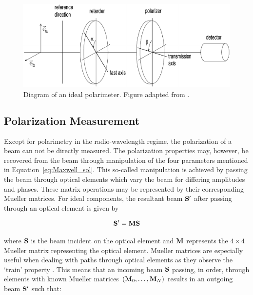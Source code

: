
\begin{figure}[t]
    \centering
    \includegraphics[width=1\textwidth]{figures/2_polarimeter.pdf}
    \caption{Diagram of an ideal polarimeter. Figure adapted from \cite{pol_in_spectra}.}
    \label{fig:polarimeter}
\end{figure}


\subsection{Polarization Measurement}\label{subsec:pol_measure}

Except for polarimetry in the radio-wavelength regime, the polarization of a beam can not be directly measured. The polarization properties may, however, be recovered from the beam through manipulation of the four parameters mentioned in Equation~\ref{eq:Maxwell_sol}. This so-called manipulation is achieved by passing the beam through optical elements which vary the beam for differing amplitudes and phases. These matrix operations may be represented by their corresponding Mueller matrices. For ideal components, the resultant beam $\mathbf{S}^{\prime}$ after passing through an optical element is given by

\begin{equation}
    \mathbf{S}^{\prime} = \mathbf{M} \mathbf{S}
\end{equation}

\noindent where $\mathbf{S}$ is the beam incident on the optical element and $\mathbf{M}$ represents the $4 \times 4$ Mueller matrix representing the optical element. Mueller matrices are especially useful when dealing with paths through optical elements as they observe the `train' property \citep{Mueller_train}. This means that an incoming beam $\mathbf{S}$ passing, in order, through elements with known Mueller matrices $(\mathbf{M}_{0}, \dots, \mathbf{M}_{N})$ results in an outgoing beam $\mathbf{S}^{\prime}$ such that:

